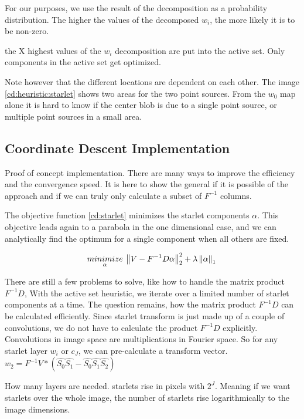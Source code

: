 For our purposes, we use the result of the decomposition as a probability distribution. The higher the values of the decomposed $w_i$, the more likely it is to be non-zero.

the X highest values of the $w_i$ decomposition are put into the active set. Only components in the active set get optimized.

Note however that the different locations are dependent on each other. The image \ref{cd:heuristic:starlet} shows two areas for the two point sources. From the $w_0$ map alone it is hard to know if the center blob is due to a single point source, or multiple point sources in a small area.


\subsection{Coordinate Descent Implementation}
Proof of concept implementation. There are many ways to improve the efficiency and the convergence speed. It is here to show  the general if it is possible of the approach and if we can truly only calculate a subset of $F^{-1}$ columns.

The objective function \eqref{cd:starlet} minimizes the starlet components $\alpha$. This objective leads again to a parabola in the one dimensional case, and we can analytically find the optimum for a single component when all others are fixed. 

\begin{equation}\label{cd:starlet}
\underset{\alpha}{minimize} \: \left \| V - F^{-1}D\alpha \right \|_2^2 + \lambda \left \| \alpha \right \|_1 \\
\end{equation}

There are still a few problems to solve, like how to handle the matrix product $F^{-1}D$, 
With the active set heuristic, we iterate over a limited number of starlet components at a time. The question remains, how the matrix product $F^{-1}D$ can be calculated efficiently. Since starlet transform is just made up of a couple of convolutions, we do not have to calculate the product $F^{-1}D$ explicitly. Convolutions in image space are multiplications in Fourier space. 
So for any starlet layer $w_i$ or $c_J$, we can pre-calculate a transform vector. 
$w_2 = F^{-1}V * (\hat{S_0}\hat{S_1} - \hat{S_0}\hat{S_1}\hat{S_2})$

How many layers are needed. starlets rise in pixels with $2^J$. Meaning if we want starlets over the whole image, the number of starlets rise logarithmically to the image dimensions.

